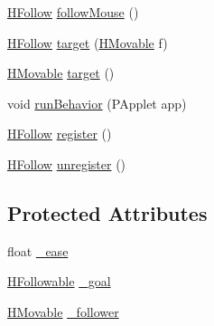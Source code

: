 \begin{DoxyCompactItemize}
\item 
\hyperlink{classhype_1_1behavior_1_1_h_follow}{H\-Follow} \hyperlink{classhype_1_1behavior_1_1_h_follow_a022ccf3abb98107504567513e8e14b6b}{follow\-Mouse} ()
\item 
\hyperlink{classhype_1_1behavior_1_1_h_follow}{H\-Follow} \hyperlink{classhype_1_1behavior_1_1_h_follow_af3d55458dd84d7474f1a2b94847c8adf}{target} (\hyperlink{interfacehype_1_1interfaces_1_1_h_movable}{H\-Movable} f)
\item 
\hyperlink{interfacehype_1_1interfaces_1_1_h_movable}{H\-Movable} \hyperlink{classhype_1_1behavior_1_1_h_follow_a05eb5994640ef3d0d361b85840a34aae}{target} ()
\item 
void \hyperlink{classhype_1_1behavior_1_1_h_follow_aad6aec23d49277932ea3f924526482ed}{run\-Behavior} (P\-Applet app)
\item 
\hyperlink{classhype_1_1behavior_1_1_h_follow}{H\-Follow} \hyperlink{classhype_1_1behavior_1_1_h_follow_a16bee863c1466702886a8e0884fb92d0}{register} ()
\item 
\hyperlink{classhype_1_1behavior_1_1_h_follow}{H\-Follow} \hyperlink{classhype_1_1behavior_1_1_h_follow_a7f1254633c3c04d687817ae0d8cec63c}{unregister} ()
\end{DoxyCompactItemize}
\subsection*{Protected Attributes}
\begin{DoxyCompactItemize}
\item 
float \hyperlink{classhype_1_1behavior_1_1_h_follow_a37c6ea2c768435a71cab8cc695526612}{\-\_\-ease}
\item 
\hyperlink{interfacehype_1_1interfaces_1_1_h_followable}{H\-Followable} \hyperlink{classhype_1_1behavior_1_1_h_follow_a23ba684e7c4bb13c43c7c0abc2210e8d}{\-\_\-goal}
\item 
\hyperlink{interfacehype_1_1interfaces_1_1_h_movable}{H\-Movable} \hyperlink{classhype_1_1behavior_1_1_h_follow_a980384761a607794e839445e0c2e3f5a}{\-\_\-follower}
\end{DoxyCompactItemize}


